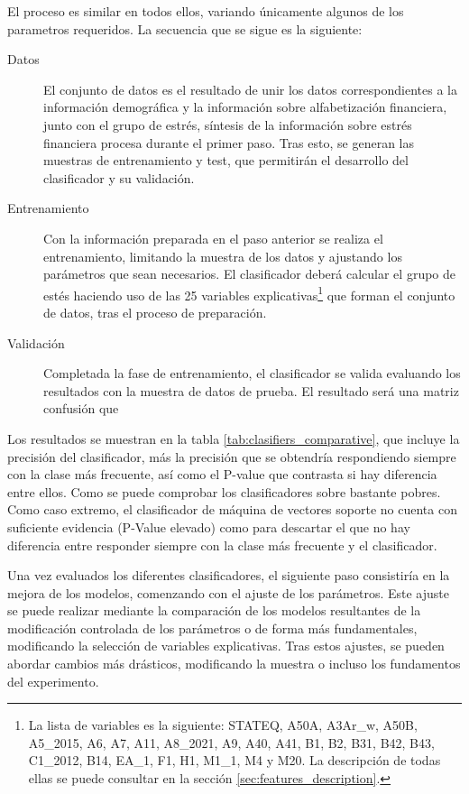 \documentclass[a4paper, 11pt]{article}
\begin{document}
El proceso es similar en todos ellos, variando únicamente algunos de los parametros 
requeridos. La secuencia que se sigue es la siguiente:
\begin{description}
    \item[Datos] El conjunto de datos es el resultado de unir los 
    datos correspondientes a la información demográfica y la información sobre 
    alfabetización financiera, junto con el grupo de estrés, síntesis de la información
    sobre estrés financiera procesa durante el primer paso. Tras esto, se generan las
    muestras de entrenamiento y test, que permitirán el desarrollo del clasificador y
    su validación.
    \item[Entrenamiento] Con la información preparada en el paso anterior
    se realiza el entrenamiento, limitando la muestra de los datos y ajustando los parámetros
    que sean necesarios. El clasificador deberá calcular el grupo de estés haciendo uso de 
    las 25 variables explicativas\footnote{La lista de variables es la siguiente: STATEQ, A50A,
    A3Ar\_w, A50B, A5\_2015, A6, A7, A11, A8\_2021, A9, A40, A41, B1, B2, B31, B42, B43, C1\_2012,
    B14, EA\_1, F1, H1, M1\_1, M4 y M20. La descripción de todas ellas se puede consultar en la sección \ref{sec:features_description}.} que forman el conjunto de datos, tras el proceso de
    preparación. 
    \item[Validación] Completada la fase de entrenamiento, el clasificador se 
    valida evaluando los resultados con la muestra de datos de prueba. El resultado será una
    matriz confusión que
\end{description}
Los resultados se muestran en la tabla \ref{tab:clasifiers_comparative}, que incluye la
precisión del clasificador, más la precisión que se obtendría respondiendo siempre con la
clase más frecuente, así como el P-value que contrasta si hay diferencia entre ellos. 
Como se puede comprobar los clasificadores sobre bastante pobres. Como caso extremo, el
clasificador de máquina de vectores soporte no cuenta con suficiente evidencia (P-Value 
elevado) como para descartar el que no hay diferencia entre responder siempre con la 
clase más frecuente y el clasificador.

Una vez evaluados los diferentes clasificadores, el siguiente paso consistiría en la mejora
de los modelos, comenzando con el ajuste de los parámetros. Este ajuste se puede realizar
mediante la comparación de los modelos resultantes de la modificación controlada de los 
parámetros o de forma más fundamentales, modificando la selección de variables explicativas.
Tras estos ajustes, se pueden abordar cambios más drásticos, modificando la muestra o incluso
los fundamentos del experimento.
\end{document}
